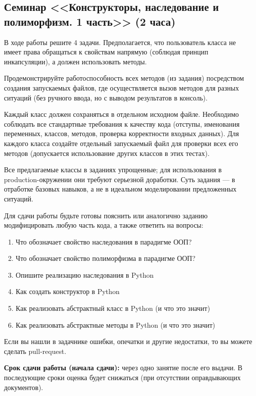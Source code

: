 \subsection{Семинар <<Конструкторы, наследование и полиморфизм. 1 часть>>  
(2 часа)}


В ходе работы решите 4 задачи. 
Предполагается, что пользователь класса не имеет права обращаться к свойствам напрямую 
(соблюдая принцип инкапсуляции), а должен использовать методы. 

Продемонстрируйте работоспособность всех методов (из задания) 
посредством создания запускаемых файлов, где осуществляется 
вызов методов для разных ситуаций 
(без ручного ввода, но с выводом результатов в консоль). 

Каждый класс должен сохраняться в отдельном исходном файле. 
Необходимо соблюдать все стандартные требования к качеству кода 
(отступы, именования переменных, классов, методов, 
проверка корректности входных данных).
Для каждого класса создайте отдельный запускаемый файл для проверки всех его методов 
(допускается использование других классов в этих тестах).

Все предлагаемые классы в заданиях упрощенные; для использования в production-окружении они требуют серьезной доработки. Суть задания — в отработке базовых навыков, а не в идеальном моделировании предложенных ситуаций.

Для сдачи работы будьте готовы пояснить или аналогично заданию модифицировать любую часть кода, а также ответить на вопросы:
\begin{enumerate}
    \item Что обозначает свойство наследования в парадигме ООП?
    \item Что обозначает свойство полиморфизма в парадигме ООП?
    \item Опишите реализацию наследования в Python
    \item Как создать конструктор в Python
    \item Как реализовать абстрактный класс в Python (и что это значит)
    \item Как реализовать абстрактные методы в Python (и что это значит)
\end{enumerate}

Если вы нашли в задачнике ошибки, опечатки и другие недостатки, то вы можете сделать pull-request. 

\textbf{Срок сдачи работы (начала сдачи):} через одно занятие после его выдачи. В последующие сроки оценка будет снижаться (при отсутствии оправдывающих документов).

